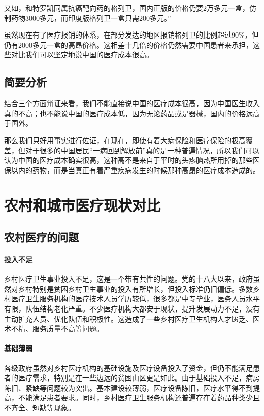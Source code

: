 \documentclass[11pt,twoside,a4paper]{article}
\begin{document}
		又如，和特罗凯同属抗癌靶向药的格列卫，国内正版的价格仍要$2$万多元一盒，仿制药物$3000$多元，而印度版格列卫一盒只需$200$多元。”
		
		虽然现在有了医疗报销的体系，在部分发达的地区报销格列卫的比例超过$90\%$，但仍有$2000$多元一盒的高昂价格。这相差十几倍的价格仍然需要中国患者来承担，这些对比我们可以坚定地说中国的医疗成本很高。
		
		\subsection{简要分析}
		结合三个方面辩证来看，我们不能直接说中国的医疗成本很高，因为中国医生收入真的不高；也不能说中国的医疗成本低，因为无论药品或是器械，国内的价格远高于国外。
		
		那么我们只好用事实进行佐证，在现在，即使有着大病保险和医疗保险的极高覆盖，但对于很多的中国居民“一病回到解放前”真的是一种普遍情况，所以我们可以认为中国的医疗成本确实很高，这种高不是来自于平时的头疼脑热所用掉的那些医保以内的药物，而是当真正有着严重疾病发生的时候那种高昂的医疗成本造成的。
		
		\section{农村和城市医疗现状对比}
		\subsection{农村医疗的问题}
		\paragraph{投入不足}
		乡村医疗卫生事业投入不足，这是一个带有共性的问题。党的十八大以来，政府虽然对乡村特别是贫困乡村卫生事业的投入有所增长，但投入标准仍旧偏低。多数乡村医疗卫生服务机构的医疗技术人员学历较低，很多都是中专毕业，医务人员水平有限，队伍结构老化严重。不少医疗机构大都安于现状，提升发展动力不足，没有主动扩充人员、优化队伍和积极性。这造成了一些乡村医疗卫生机构人才匮乏、医术不精、服务质量不高等问题。
		
		\paragraph{基础薄弱}
		各级政府虽然对乡村医疗机构的基础设施及医疗设备投入了资金，但仍不能满足患者的医疗需求，特别是在一些边远的贫困山区更是如此。由于基础投入不足，病房陈旧、紧缺等问题较为突出。基本建设较薄弱，医疗设备陈旧，医疗水平得不到提高，不能满足患者要求。同时，乡村医疗卫生服务机构还普遍存在着药品种类少且不齐全、短缺等现象。
\end{document}
